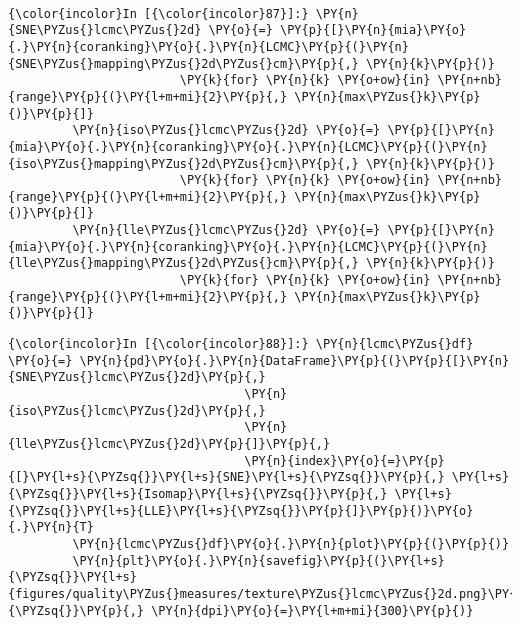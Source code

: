     \begin{center}
    \end{center}
    { \hspace*{\fill} \\}

    \begin{Verbatim}[commandchars=\\\{\}]
{\color{incolor}In [{\color{incolor}87}]:} \PY{n}{SNE\PYZus{}lcmc\PYZus{}2d} \PY{o}{=} \PY{p}{[}\PY{n}{mia}\PY{o}{.}\PY{n}{coranking}\PY{o}{.}\PY{n}{LCMC}\PY{p}{(}\PY{n}{SNE\PYZus{}mapping\PYZus{}2d\PYZus{}cm}\PY{p}{,} \PY{n}{k}\PY{p}{)}
                        \PY{k}{for} \PY{n}{k} \PY{o+ow}{in} \PY{n+nb}{range}\PY{p}{(}\PY{l+m+mi}{2}\PY{p}{,} \PY{n}{max\PYZus{}k}\PY{p}{)}\PY{p}{]}
         \PY{n}{iso\PYZus{}lcmc\PYZus{}2d} \PY{o}{=} \PY{p}{[}\PY{n}{mia}\PY{o}{.}\PY{n}{coranking}\PY{o}{.}\PY{n}{LCMC}\PY{p}{(}\PY{n}{iso\PYZus{}mapping\PYZus{}2d\PYZus{}cm}\PY{p}{,} \PY{n}{k}\PY{p}{)}
                        \PY{k}{for} \PY{n}{k} \PY{o+ow}{in} \PY{n+nb}{range}\PY{p}{(}\PY{l+m+mi}{2}\PY{p}{,} \PY{n}{max\PYZus{}k}\PY{p}{)}\PY{p}{]}
         \PY{n}{lle\PYZus{}lcmc\PYZus{}2d} \PY{o}{=} \PY{p}{[}\PY{n}{mia}\PY{o}{.}\PY{n}{coranking}\PY{o}{.}\PY{n}{LCMC}\PY{p}{(}\PY{n}{lle\PYZus{}mapping\PYZus{}2d\PYZus{}cm}\PY{p}{,} \PY{n}{k}\PY{p}{)}
                        \PY{k}{for} \PY{n}{k} \PY{o+ow}{in} \PY{n+nb}{range}\PY{p}{(}\PY{l+m+mi}{2}\PY{p}{,} \PY{n}{max\PYZus{}k}\PY{p}{)}\PY{p}{]}
\end{Verbatim}

    \begin{Verbatim}[commandchars=\\\{\}]
{\color{incolor}In [{\color{incolor}88}]:} \PY{n}{lcmc\PYZus{}df} \PY{o}{=} \PY{n}{pd}\PY{o}{.}\PY{n}{DataFrame}\PY{p}{(}\PY{p}{[}\PY{n}{SNE\PYZus{}lcmc\PYZus{}2d}\PY{p}{,}
                                 \PY{n}{iso\PYZus{}lcmc\PYZus{}2d}\PY{p}{,}
                                 \PY{n}{lle\PYZus{}lcmc\PYZus{}2d}\PY{p}{]}\PY{p}{,}
                                 \PY{n}{index}\PY{o}{=}\PY{p}{[}\PY{l+s}{\PYZsq{}}\PY{l+s}{SNE}\PY{l+s}{\PYZsq{}}\PY{p}{,} \PY{l+s}{\PYZsq{}}\PY{l+s}{Isomap}\PY{l+s}{\PYZsq{}}\PY{p}{,} \PY{l+s}{\PYZsq{}}\PY{l+s}{LLE}\PY{l+s}{\PYZsq{}}\PY{p}{]}\PY{p}{)}\PY{o}{.}\PY{n}{T}
         \PY{n}{lcmc\PYZus{}df}\PY{o}{.}\PY{n}{plot}\PY{p}{(}\PY{p}{)}
         \PY{n}{plt}\PY{o}{.}\PY{n}{savefig}\PY{p}{(}\PY{l+s}{\PYZsq{}}\PY{l+s}{figures/quality\PYZus{}measures/texture\PYZus{}lcmc\PYZus{}2d.png}\PY{l+s}{\PYZsq{}}\PY{p}{,} \PY{n}{dpi}\PY{o}{=}\PY{l+m+mi}{300}\PY{p}{)}
\end{Verbatim}

